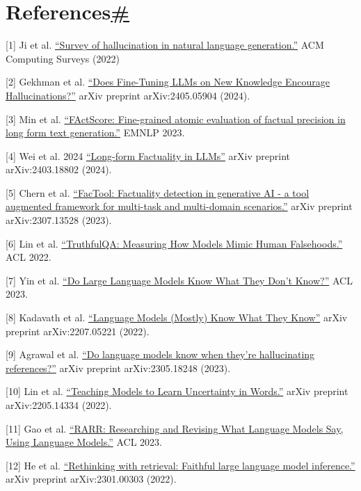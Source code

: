 \section{\texorpdfstring{References\hyperref[references]{\#}}{References\#}}\label{references}

{[}1{]} Ji et al. \href{https://arxiv.org/abs/2202.03629}{``Survey of hallucination in natural language generation.''} ACM Computing Surveys (2022)

{[}2{]} Gekhman et al. \href{https://arxiv.org/abs/2405.05904}{``Does Fine-Tuning LLMs on New Knowledge Encourage Hallucinations?''} arXiv preprint arXiv:2405.05904 (2024).

{[}3{]} Min et al. \href{https://arxiv.org/abs/2305.14251}{``FActScore: Fine-grained atomic evaluation of factual precision in long form text generation.''} EMNLP 2023.

{[}4{]} Wei et al. 2024 \href{https://arxiv.org/abs/2403.18802}{``Long-form Factuality in LLMs''} arXiv preprint arXiv:2403.18802 (2024).

{[}5{]} Chern et al. \href{https://arxiv.org/abs/2307.13528}{``FacTool: Factuality detection in generative AI - a tool augmented framework for multi-task and multi-domain scenarios.''} arXiv preprint arXiv:2307.13528 (2023).

{[}6{]} Lin et al. \href{https://arxiv.org/abs/2109.07958}{``TruthfulQA: Measuring How Models Mimic Human Falsehoods.''} ACL 2022.

{[}7{]} Yin et al. \href{https://arxiv.org/abs/2305.18153}{``Do Large Language Models Know What They Don't Know?''} ACL 2023.

{[}8{]} Kadavath et al. \href{https://arxiv.org/abs/2207.05221}{``Language Models (Mostly) Know What They Know''} arXiv preprint arXiv:2207.05221 (2022).

{[}9{]} Agrawal et al. \href{https://arxiv.org/abs/2305.18248}{``Do language models know when they're hallucinating references?''} arXiv preprint arXiv:2305.18248 (2023).

{[}10{]} Lin et al. \href{https://arxiv.org/abs/2205.14334}{``Teaching Models to Learn Uncertainty in Words.''} arXiv preprint arXiv:2205.14334 (2022).

{[}11{]} Gao et al. \href{https://arxiv.org/abs/2210.08726}{``RARR: Researching and Revising What Language Models Say, Using Language Models.''} ACL 2023.

{[}12{]} He et al. \href{https://arxiv.org/abs/2301.00303}{``Rethinking with retrieval: Faithful large language model inference.''} arXiv preprint arXiv:2301.00303 (2022).

